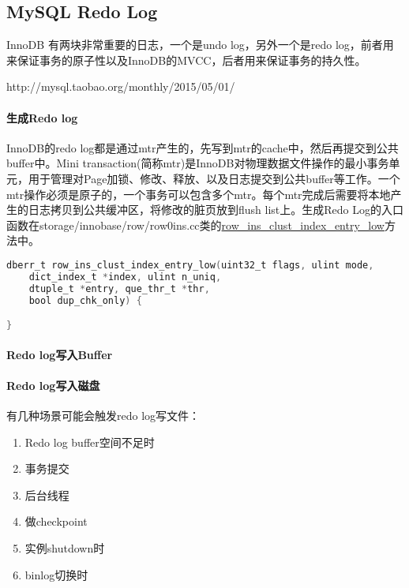 \documentclass[../../../interview-questions.tex]{subfiles}
\begin{document}
\subsection{MySQL Redo Log}

InnoDB 有两块非常重要的日志，一个是undo log，另外一个是redo log，前者用来保证事务的原子性以及InnoDB的MVCC，后者用来保证事务的持久性。

http://mysql.taobao.org/monthly/2015/05/01/


\paragraph{生成Redo log}

InnoDB的redo log都是通过mtr产生的，先写到mtr的cache中，然后再提交到公共buffer中。Mini transaction(简称mtr)是InnoDB对物理数据文件操作的最小事务单元，用于管理对Page加锁、修改、释放、以及日志提交到公共buffer等工作。一个mtr操作必须是原子的，一个事务可以包含多个mtr。每个mtr完成后需要将本地产生的日志拷贝到公共缓冲区，将修改的脏页放到flush list上。生成Redo Log的入口函数在storage/innobase/row/row0ins.cc类的\url{row\_ins\_clust\_index\_entry\_low}方法中。

\begin{lstlisting}[language=C]
dberr_t row_ins_clust_index_entry_low(uint32_t flags, ulint mode,
    dict_index_t *index, ulint n_uniq,
    dtuple_t *entry, que_thr_t *thr,
    bool dup_chk_only) {

}
\end{lstlisting}



\paragraph{Redo log写入Buffer}

\paragraph{Redo log写入磁盘}

有几种场景可能会触发redo log写文件：

\begin{enumerate}
    \item {Redo log buffer空间不足时}
    \item {事务提交}
    \item {后台线程}
    \item {做checkpoint}
    \item {实例shutdown时}
    \item {binlog切换时}
\end{enumerate}
\end{document}
